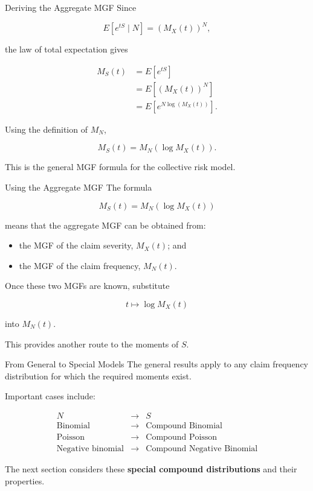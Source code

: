 \documentclass[
  ignorenonframetext,
  aspectratio=169,
]{beamer}
\providecommand{\tightlist}{%
  \setlength{\itemsep}{0pt}\setlength{\parskip}{0pt}}
\begin{document}
\begin{frame}{Deriving the Aggregate MGF}
\protect{}\label{deriving-the-aggregate-mgf}
Since

\[
E[e^{tS}\mid N]
=
\left(M_X(t)\right)^N,
\]

the law of total expectation gives

\[
\begin{aligned}
M_S(t)
&=E[e^{tS}]\\
&=E\left[\left(M_X(t)\right)^N\right]\\
&=E\left[
e^{N\log(M_X(t))}
\right].
\end{aligned}
\]

Using the definition of \(M_N\),

\[
\boxed{
M_S(t)
=
M_N\left(\log M_X(t)\right)
}.
\]

This is the general MGF formula for the collective risk model.
\end{frame}

\begin{frame}{Using the Aggregate MGF}
\protect{}\label{using-the-aggregate-mgf}
The formula

\[
\boxed{
M_S(t)=M_N\left(\log M_X(t)\right)
}
\]

means that the aggregate MGF can be obtained from:

\begin{itemize}
\tightlist
\item
  the MGF of the claim severity, \(M_X(t)\); and
\item
  the MGF of the claim frequency, \(M_N(t)\).
\end{itemize}

Once these two MGFs are known, substitute

\[
t\longmapsto \log M_X(t)
\]

into \(M_N(t)\).

This provides another route to the moments of \(S\).
\end{frame}

\begin{frame}{From General to Special Models}
\protect{}\label{from-general-to-special-models}
The general results apply to any claim frequency distribution for which
the required moments exist.

Important cases include:

\[
\boxed{
\begin{array}{ccc}
N &\longrightarrow& S\\[2pt]
\text{Binomial}
&\longrightarrow&
\text{Compound Binomial}\\
\text{Poisson}
&\longrightarrow&
\text{Compound Poisson}\\
\text{Negative binomial}
&\longrightarrow&
\text{Compound Negative Binomial}
\end{array}
}
\]

The next section considers these \textbf{special compound distributions}
and their properties.
\end{frame}
\end{document}

